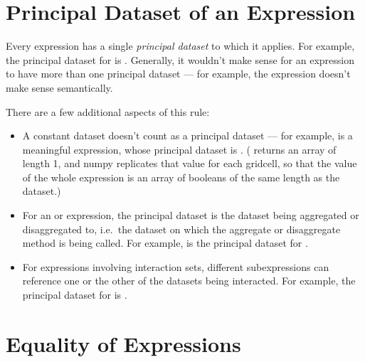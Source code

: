 \section{Principal Dataset of an Expression}

Every expression has a single \emph{principal dataset} to which it applies.
For example, the principal dataset for  is
.  Generally, it wouldn't make sense for an expression to
have more than one principal dataset --- for example, the expression
 doesn't make sense semantically.

There are a few additional aspects of this rule:

\begin{itemize}

\item A constant dataset doesn't count as a principal dataset --- for example,
is a meaningful expression, whose principal dataset is .
( returns an array of
length 1, and numpy replicates that value for each gridcell, so that the
value of the whole expression is an
array of booleans of the same length as the  dataset.)

\item For an  or  expression, the
  principal dataset is the dataset being aggregated or disaggregated to,
  i.e.\ the dataset on which the aggregate or disaggregate method is being
  called.  For example,  is the principal dataset for
  .

\item For expressions involving interaction sets, different subexpressions
  can reference one or the other of the datasets being interacted.
  For example, the principal dataset for
   is
  .

\end{itemize}

\section{Equality of Expressions}
\label{sec:expression-equality}

